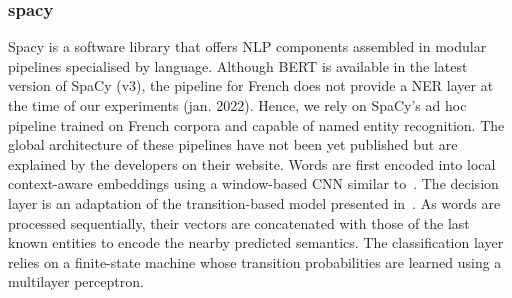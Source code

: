 \subsubsection{spacy}
Spacy is a software library that offers NLP components assembled in modular pipelines specialised by language.
Although BERT is available in the latest version of SpaCy (v3), the pipeline for French does not provide a NER layer at the time of our experiments (jan. 2022).
Hence, we rely on SpaCy's ad hoc pipeline trained on French corpora and capable of named entity recognition.
The global architecture of these pipelines have not been yet published but are explained by the developers on their website.
Words are first encoded into local context-aware embeddings using a window-based CNN similar to~\cite{collobert2011}.
The decision layer is an adaptation of the transition-based model presented in~\cite{lample2016}.
As words are processed sequentially, their vectors are concatenated with those of the last known entities to encode the nearby predicted semantics.
The classification layer relies on a finite-state machine whose transition probabilities are learned using a multilayer perceptron.






